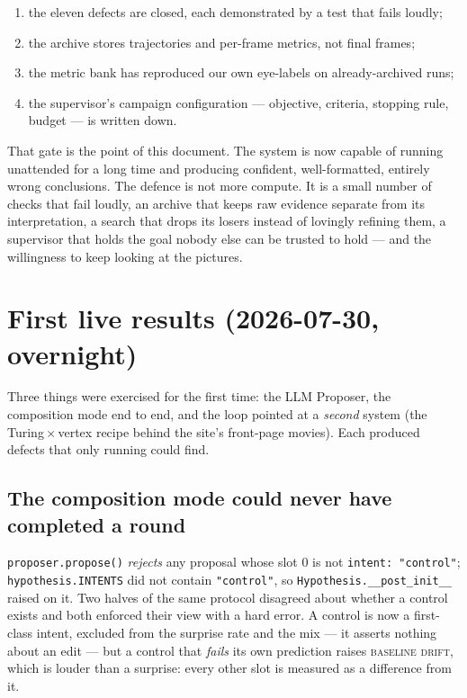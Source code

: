 \documentclass[11pt]{article}
\begin{document}
\begin{enumerate}\itemsep2pt
\item the eleven defects are closed, each demonstrated by a test that fails loudly;
\item the archive stores trajectories and per-frame metrics, not final frames;
\item the metric bank has reproduced our own eye-labels on already-archived runs;
\item the supervisor's campaign configuration --- objective, criteria, stopping rule, budget --- is
written down.
\end{enumerate}

That gate is the point of this document. The system is now capable of running unattended for a
long time and producing confident, well-formatted, entirely wrong conclusions. The defence is not
more compute. It is a small number of checks that fail loudly, an archive that keeps raw evidence
separate from its interpretation, a search that drops its losers instead of lovingly refining
them, a supervisor that holds the goal nobody else can be trusted to hold --- and the willingness
to keep looking at the pictures.

\section{First live results (2026-07-30, overnight)}
\label{sec:live}

Three things were exercised for the first time: the LLM Proposer, the composition mode end to end,
and the loop pointed at a \emph{second} system (the Turing\,$\times$\,vertex recipe behind the
site's front-page movies). Each produced defects that only running could find.

\subsection{The composition mode could never have completed a round}

\texttt{proposer.propose()} \emph{rejects} any proposal whose slot 0 is not
\texttt{intent: "control"}; \texttt{hypothesis.INTENTS} did not contain \texttt{"control"}, so
\texttt{Hypothesis.\_\_post\_init\_\_} raised on it. Two halves of the same protocol disagreed
about whether a control exists and both enforced their view with a hard error. A control is now a
first-class intent, excluded from the surprise rate and the mix --- it asserts nothing about an
edit --- but a control that \emph{fails} its own prediction raises \textsc{baseline drift}, which
is louder than a surprise: every other slot is measured as a difference from it.
\end{document}
